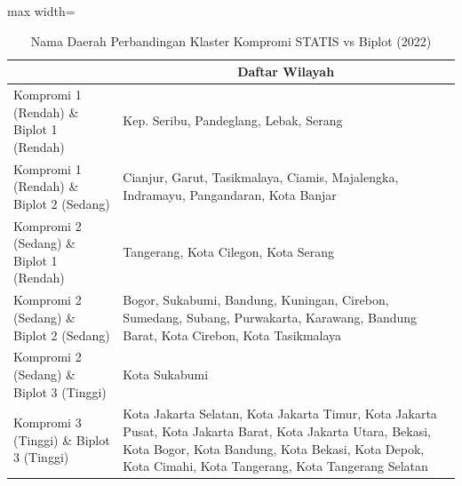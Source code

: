 \begin{table}[H]
\centering
\caption{Nama Daerah Perbandingan Klaster Kompromi STATIS vs Biplot (2022)} \label{tab:app2biplot_comp_name_2022}
\begin{adjustbox}{max width=\textwidth}
\begin{tabular}{|>{\centering\arraybackslash}p{4cm}|p{10cm}|}
\hline
\multicolumn{1}{|c|}{\textbf{Kategori}} & \multicolumn{1}{c|}{\textbf{Daftar Wilayah}} \\
\hline
Kompromi 1 (Rendah) \& Biplot 1 (Rendah) & Kep. Seribu, Pandeglang, Lebak, Serang \\
\hline
Kompromi 1 (Rendah) \& Biplot 2 (Sedang) & Cianjur, Garut, Tasikmalaya, Ciamis, Majalengka, Indramayu, Pangandaran, Kota Banjar \\
\hline
Kompromi 2 (Sedang) \& Biplot 1 (Rendah) & Tangerang, Kota Cilegon, Kota Serang \\
\hline
Kompromi 2 (Sedang) \& Biplot 2 (Sedang) & Bogor, Sukabumi, Bandung, Kuningan, Cirebon, Sumedang, Subang, Purwakarta, Karawang, Bandung Barat, Kota Cirebon, Kota Tasikmalaya \\
\hline
Kompromi 2 (Sedang) \& Biplot 3 (Tinggi) & Kota Sukabumi \\
\hline
Kompromi 3 (Tinggi) \& Biplot 3 (Tinggi) & Kota Jakarta Selatan, Kota Jakarta Timur, Kota Jakarta Pusat, Kota Jakarta Barat, Kota Jakarta Utara, Bekasi, Kota Bogor, Kota Bandung, Kota Bekasi, Kota Depok, Kota Cimahi, Kota Tangerang, Kota Tangerang Selatan \\
\hline
\end{tabular}
\end{adjustbox}
\end{table}